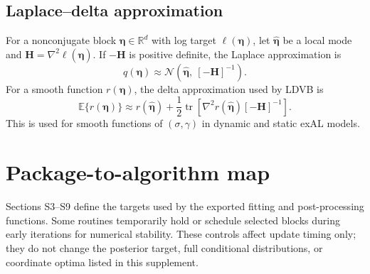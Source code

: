 \documentclass[nojss,noheadings]{jss}
\newcommand{\R}{\mathbb{R}}
\renewcommand{\E}{\mathbb{E}}
\newcommand{\tr}{\operatorname{tr}}
\newcommand{\vect}[1]{\bm{#1}}
\newcommand{\mat}[1]{\mathbf{#1}}
\newcommand{\N}{\mathcal{N}}
\begin{document}
\subsection{Laplace--delta approximation}

For a nonconjugate block $\vect{\eta}\in\R^d$ with log target
$\ell(\vect{\eta})$, let $\hat{\vect{\eta}}$ be a local mode and
$\mat{H}=\nabla^2\ell(\hat{\vect{\eta}})$. If $-\mat{H}$ is positive definite,
the Laplace approximation is
\begin{equation}
q(\vect{\eta})\approx
\N\left(\hat{\vect{\eta}},\ [-\mat{H}]^{-1}\right).
\label{eq:ld_gaussian}
\end{equation}
For a smooth function $r(\vect{\eta})$, the delta approximation used by LDVB is
\begin{equation}
\E\{r(\vect{\eta})\}
\approx
r(\hat{\vect{\eta}})
+
\frac{1}{2}\tr\left[
\nabla^2 r(\hat{\vect{\eta}})[-\mat{H}]^{-1}
\right].
\label{eq:delta_generic}
\end{equation}
This is used for smooth functions of $(\sigma,\gamma)$ in dynamic and static
exAL models.

\section{Package-to-algorithm map}
\label{sec:package_algorithm_map}

Sections S3--S9 define the targets used by the exported fitting and
post-processing functions. Some routines temporarily hold or schedule selected
blocks during early iterations for numerical stability. These controls affect
update timing only; they do not change the posterior target, full conditional
distributions, or coordinate optima listed in this supplement.
\end{document}
